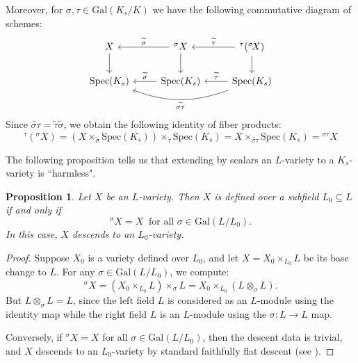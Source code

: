 \documentclass[10pt]{amsart}
\newtheorem{proposition}[theorem]{Proposition}
\theoremstyle{definition}
\newcommand{\Spe}{ {\mathrm{Spec} } }
\newcommand{\Gal}{{ \mathrm{Gal}}}
\begin{document}
Moreover, for $\sigma, \tau \in \Gal(K_s/K)$ we have the following commutative diagram of schemes:
\begin{equation*}
    \begin{tikzcd}
        X  \arrow[d] & ^\sigma X \arrow[d] \arrow[l, "\widetilde{\sigma}"'] & ^\tau( ^\sigma \! X) \arrow[d]  \arrow[l, "\widetilde{\tau}"']\\
        \Spe(K_s) & \Spe(K_s) \arrow[l, "\widetilde{\sigma}"']& \Spe(K_s) \arrow[l, "\widetilde{\tau}"'] \arrow[ll, bend left =20, "\widetilde{\sigma\tau}"]
    \end{tikzcd}
\end{equation*}
Since $\widetilde{\sigma \tau} = \widetilde{\tau}\widetilde{\sigma}$, we obtain the following identity of fiber products: 
\begin{equation}\label{eq:strictness of action}
^\tau( ^\sigma \! X) = (X \times_{\tilde{\sigma}} \Spe(K_s) )\times_{\widetilde{\tau}} \Spe(K_s) = X \times_{\widetilde{\sigma\tau}}\Spe(K_s) = { ^{\sigma \tau}\! X} 
\end{equation}

The following proposition tells us that extending by scalars an $L$-variety to a $K_s$-variety is ``harmless".

\begin{proposition} \label{prop:invArith}
Let \( X \) be an \( L \)-variety. Then \( X \) is defined over a subfield \( L_0 \subseteq L \) if and only if
\[
{^\sigma\!X} = X \  \text{ for all } \sigma \in \Gal(L/L_0).
\]
In this case, \( X \) descends to an \( L_0 \)-variety.
\end{proposition}
\begin{proof}
Suppose \( X_0 \) is a variety defined over \( L_0 \), and let \( X = X_0 \times_{L_0} L \) be its base change to \( L \). For any \( \sigma \in \Gal(L/L_0) \), we compute:
\[
{^\sigma\!X} = \left(X_0 \times_{L_0} L\right) \times_{\sigma} L = X_0 \times_{L_0} (L \otimes_{\sigma} L).
\]
But \( L \otimes_{\sigma} L = L \), since the left field  $L$ is considered as an $L$-module using the  identity map while the right field $L$  is an $L$-module using the $\sigma \colon L\rightarrow L$ map.

Conversely, if \( {^\sigma\!X} = X \) for all \( \sigma \in \Gal(L/L_0) \), then the descent data is trivial, and \( X \) descends to an \( L_0 \)-variety by standard faithfully flat descent (see \cite[SGA1]{SGA1}).
\end{proof}
\end{document}
